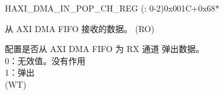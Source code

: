 \begin{register}{H}{AXI\_DMA\_IN\_POP\_CH\_REG (: 0-2)}{0x001C+0x68*}\label{regdesc:AXIDMAINPOPCHNREG}
%
%
%
\regnewline%
\begin{regdesc}\begin{reglist}
\label{fielddesc:AXIDMAINFIFORDATACHN}\item [AXI\_DMA\_INFIFO\_RDATA\_CH\regindex{n}] 从 AXI DMA FIFO 接收的数据。 (RO)
\label{fielddesc:AXIDMAINFIFOPOPCHN}\item [AXI\_DMA\_INFIFO\_POP\_CH\regindex{n}] 配置是否从 AXI DMA FIFO 为 RX 通道  弹出数据。\\0：无效值。没有作用\\1：弹出\\ (WT)
\end{reglist}\end{regdesc}
\end{register}


